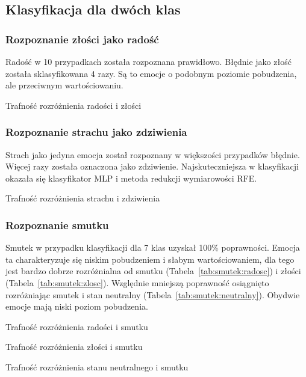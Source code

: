 \documentclass[a4paper,12pt,twoside,openany]{report}
\newcommand{\Tab}[1]{(Tabela~\ref{#1})}
\begin{document}
\subsection{Klasyfikacja dla dwóch klas}
\subsubsection{Rozpoznanie złości jako radość}
Radość w 10 przypadkach została rozpoznana prawidłowo. 
Błędnie jako złość została sklasyfikowana 4 razy. 
Są to emocje o podobnym poziomie pobudzenia, ale przeciwnym wartościowaniu.
\begin{table}[hc!]
	\caption{Trafność rozróżnienia radości i złości}
	\centering
	
\end{table}
\subsubsection{Rozpoznanie strachu jako zdziwienia}
Strach jako jedyna emocja został rozpoznany w większości przypadków błędnie.
Więcej razy została oznaczona jako zdziwienie.
Najskuteczniejsza w klasyfikacji okazała się klasyfikator MLP i metoda redukcji wymiarowości RFE.
\begin{table}[hc!]
	\caption{Trafność rozróżnienia strachu i zdziwienia}
	\centering
	
\end{table}

\subsubsection{Rozpoznanie smutku}
Smutek w przypadku klasyfikacji dla 7 klas uzyskał 100\% poprawności. 
Emocja ta charakteryzuje się niskim pobudzeniem i słabym wartościowaniem,
dla tego jest bardzo dobrze rozróżnialna od smutku \Tab{tab:smutek:radosc} i złości \Tab{tab:smutek:zlosc}.
Względnie mniejszą poprawność osiągnięto rozróżniając smutek i stan neutralny \Tab{tab:smutek:neutralny}.
Obydwie emocje mają niski poziom pobudzenia.
\begin{table}[hc!]
	\caption{Trafność rozróżnienia radości i smutku}
	\centering
	
	\label{tab:smutek:radosc}
\end{table}
\begin{table}[hc!]
	\caption{Trafność rozróżnienia złości i smutku}
	\centering
	
	\label{tab:smutek:zlosc}
\end{table}
\begin{table}[hc!]
	\caption{Trafność rozróżnienia stanu neutralnego i smutku}
	\centering
	
	\label{tab:smutek:neutralny}
\end{table}
\end{document}
